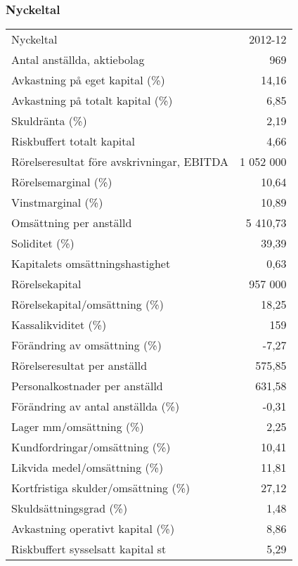 \documentclass[10pt,a4paper]{article}
\begin{document}
\subsubsection{Nyckeltal}
\begin{tabular}{ l r }
	Nyckeltal & 2012-12\\
	Antal anställda, aktiebolag & 969\\
	Avkastning på eget kapital (\%) & 14,16\\
	Avkastning på totalt kapital (\%) & 6,85\\
	Skuldränta (\%) & 2,19\\
	Riskbuffert totalt kapital & 4,66\\
	Rörelseresultat före avskrivningar, EBITDA & 1 052 000\\
	Rörelsemarginal (\%) & 10,64\\
	Vinstmarginal (\%) & 10,89\\
	Omsättning per anställd & 5 410,73\\
	Soliditet (\%) & 39,39\\
	Kapitalets omsättningshastighet & 0,63\\
	Rörelsekapital & 957 000\\
	Rörelsekapital/omsättning (\%) & 18,25\\
	Kassalikviditet (\%) & 159\\
	Förändring av omsättning (\%) & -7,27\\
	Rörelseresultat per anställd & 575,85\\
	Personalkostnader per anställd & 631,58\\
	Förändring av antal anställda (\%) & -0,31\\
	Lager mm/omsättning (\%) & 2,25\\
	Kundfordringar/omsättning (\%) & 10,41\\
	Likvida medel/omsättning (\%) & 11,81\\
	Kortfristiga skulder/omsättning (\%) & 27,12\\
	Skuldsättningsgrad (\%) & 1,48\\
	Avkastning operativt kapital (\%) & 8,86\\
	Riskbuffert sysselsatt kapital st & 5,29\\
\end{tabular}
\end{document}

